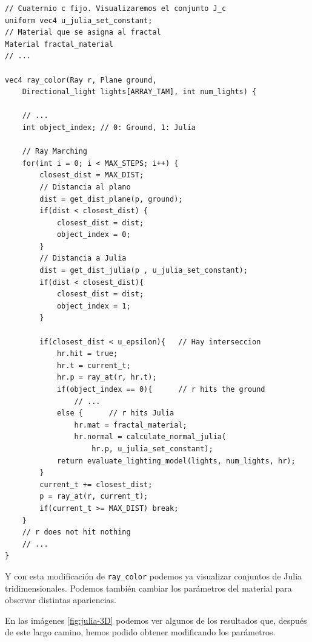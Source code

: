 \begin{lstlisting}
// Cuaternio c fijo. Visualizaremos el conjunto J_c
uniform vec4 u_julia_set_constant;
// Material que se asigna al fractal
Material fractal_material
// ...

vec4 ray_color(Ray r, Plane ground, 
    Directional_light lights[ARRAY_TAM], int num_lights) {

    // ... 
    int object_index; // 0: Ground, 1: Julia

    // Ray Marching
    for(int i = 0; i < MAX_STEPS; i++) {
        closest_dist = MAX_DIST;
        // Distancia al plano
        dist = get_dist_plane(p, ground);
        if(dist < closest_dist) {
            closest_dist = dist;
            object_index = 0;
        }
        // Distancia a Julia
        dist = get_dist_julia(p , u_julia_set_constant);
        if(dist < closest_dist){
            closest_dist = dist;
            object_index = 1;
        }

        if(closest_dist < u_epsilon){   // Hay interseccion
            hr.hit = true;
            hr.t = current_t;
            hr.p = ray_at(r, hr.t);
            if(object_index == 0){      // r hits the ground
                // ... 
            else {      // r hits Julia
                hr.mat = fractal_material;
                hr.normal = calculate_normal_julia(
                    hr.p, u_julia_set_constant);
            return evaluate_lighting_model(lights, num_lights, hr);
        }
        current_t += closest_dist;
        p = ray_at(r, current_t);
        if(current_t >= MAX_DIST) break;
    }
    // r does not hit nothing
    // ... 
}
\end{lstlisting}

Y con esta modificación de \verb|ray_color| podemos ya visualizar conjuntos de Julia tridimensionales. Podemos también cambiar los parámetros del material para observar distintas apariencias. 

En las imágenes \ref{fig:julia-3D} podemos ver algunos de los resultados que, después de este largo camino, hemos podido obtener modificando los parámetros.

